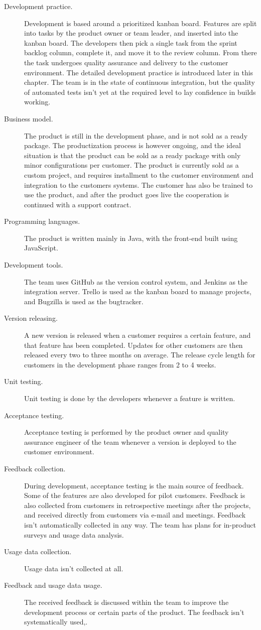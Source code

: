 \documentclass[english]{tktltiki2}
\theoremstyle{definition}
\theoremstyle{remark}
\begin{document}
\begin{description}
  \item[Development practice.] Development is based around a prioritized kanban board. Features are split into tasks by the product owner or team leader, and inserted into the kanban board. The developers then pick a single task from the sprint backlog column, complete it, and move it to the review column. From there the task undergoes quality assurance and delivery to the customer environment. The detailed development practice is introduced later in this chapter. The team is in the state of continuous integration, but the quality of automated tests isn't yet at the required level to lay confidence in builds working. 
  \item[Business model.] The product is still in the development phase, and is not sold as a ready package. The productization process is however ongoing, and the ideal situation is that the product can be sold as a ready package with only minor configurations per customer. The product is currently sold as a custom project, and requires installment to the customer environment and integration to the customers systems. The customer has also be trained to use the product, and after the product goes live the cooperation is continued with a support contract.
  \item[Programming languages.] The product is written mainly in Java, with the front-end built using JavaScript. 
  \item[Development tools.] The team uses GitHub as the version control system, and Jenkins as the integration server. Trello is used as the kanban board to manage projects, and Bugzilla is used as the bugtracker. 
  \item[Version releasing.] A new version is released when a customer requires a certain feature, and that feature has been completed. Updates for other customers are then released every two to three months on average. The release cycle length for customers in the development phase ranges from 2 to 4 weeks. 
  \item[Unit testing.] Unit testing is done by the developers whenever a feature is written. 
  \item[Acceptance testing.] Acceptance testing is performed by the product owner and quality assurance engineer of the team whenever a version is deployed to the customer environment. 
  \item[Feedback collection.] During development, acceptance testing is the main source of feedback. Some of the features are also developed for pilot customers. Feedback is also collected from customers in retrospective meetings after the projects, and received directly from customers via e-mail and meetings. Feedback isn't automatically collected in any way. The team has plans for in-product surveys and usage data analysis.
  \item[Usage data collection.] Usage data isn't collected at all.
  \item[Feedback and usage data usage.] The received feedback is discussed within the team to improve the development process or certain parts of the product. The feedback isn't systematically used,. 
\end{description}
\end{document}
